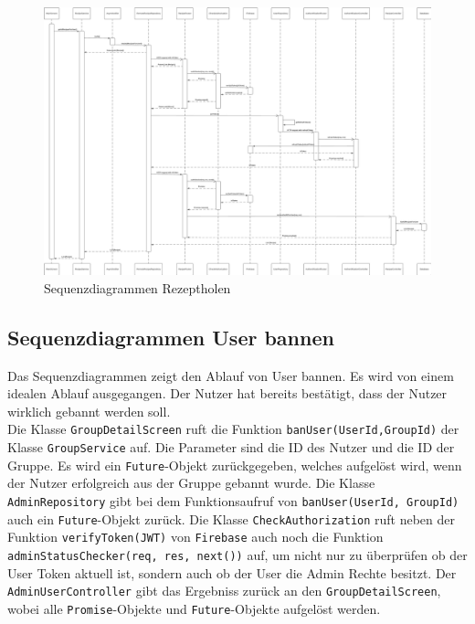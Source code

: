\documentclass{entwurfsheft}
\begin{document}
        \begin{figure}[htp]
            \centering
            \includegraphics[width = \linewidth]{images/processDescription/SequenzdiagrammRecipeFetching.pdf}
            \caption{Sequenzdiagrammen Rezeptholen}
        \end{figure}

    \newpage
    
    \subsection{Sequenzdiagrammen User bannen}
        Das Sequenzdiagrammen zeigt den Ablauf von User bannen. Es wird von einem idealen Ablauf ausgegangen. Der Nutzer hat bereits bestätigt, dass der Nutzer wirklich gebannt werden soll.\\
        Die Klasse \texttt{GroupDetailScreen} ruft die Funktion \texttt{banUser(UserId,GroupId)} der Klasse \texttt{GroupService} auf. Die Parameter sind die ID des Nutzer und die ID der Gruppe. Es wird ein \texttt{Future}-Objekt zurückgegeben, welches aufgelöst wird, wenn der Nutzer erfolgreich aus der Gruppe gebannt wurde. Die Klasse \texttt{AdminRepository} gibt bei dem Funktionsaufruf von \texttt{banUser(UserId, GroupId)} auch ein \texttt{Future}-Objekt zurück. Die Klasse \texttt{CheckAuthorization} ruft neben der Funktion \texttt{verifyToken(JWT)} von \texttt{Firebase} auch noch die Funktion \texttt{adminStatusChecker(req, res, next())} auf, um nicht nur zu überprüfen ob der User Token aktuell ist, sondern auch ob der User die Admin Rechte besitzt. Der \texttt{AdminUserController} gibt das Ergebniss zurück an den \texttt{GroupDetailScreen}, wobei alle \texttt{Promise}-Objekte und \texttt{Future}-Objekte aufgelöst werden.
\end{document}
